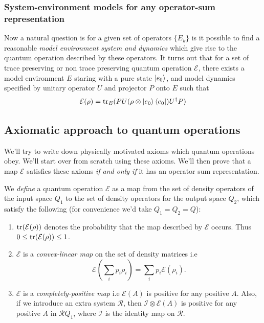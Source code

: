 \subsubsection{System-environment models for any operator-sum representation}
Now a natural question is for a given set of operators $\{ E_k \}$ is it possible to find a reasonable \textit{model environment system and dynamics} which give rise to the quantum operation described by these operators. It turns out that for a set of trace preserving or non trace preserving quantum operation $\mathcal{E}$, there exists a model environment $E$ staring with a pure state $\ket{e_0}$, and model dynamics specified by unitary operator $U$ and projector $P$ onto $E$ such that
\begin{equation}
    \mathcal{E}(\rho) = \text{tr}_E(PU(\rho \otimes \ket{e_0}\bra{e_0})U^\dag P)
\end{equation}

\subsection{Axiomatic approach to quantum operations}
We'll try to write down physically motivated axioms which quantum operations obey. We'll start over from scratch using these axioms. We'll then prove that a map $\mathcal{E}$ satisfies these axioms \textit{if and only if} it has an operator sum representation.

We \textit{define} a quantum operation $\mathcal{E}$ as a map from the set of density operators of the input space $Q_1$ to the set of density operators for the output space $Q_2$, which satisfy the following (for convenience we'd take $Q_1=Q_2=Q$):
\begin{enumerate}
    \item $\text{tr}(\mathcal{E}(\rho))$ denotes the probability that the map described by $\mathcal{E}$ occurs. Thus $0 \leq \text{tr}(\mathcal{E}(\rho)) \leq 1$.
    \item $\mathcal{E}$ is a \textit{convex-linear map} on the set of density matrices i.e
    \begin{equation}
        \mathcal{E}\left( \sum_i p_i\rho_i \right) = \sum_i p_i\mathcal{E}(\rho_i).
    \end{equation}
    \item $\mathcal{E}$ is a \textit{completely-positive map} i.e $\mathcal{E}(A)$ is positive for any positive $A$. Also, if we introduce an extra system $\mathcal{R}$, then $\mathcal{I}\otimes \mathcal{E}(A) $ is positive for any positive $A$ in $\mathcal{R}Q_1$, where $\mathcal{I}$ is the identity map on $\mathcal{R}$.
\end{enumerate}

